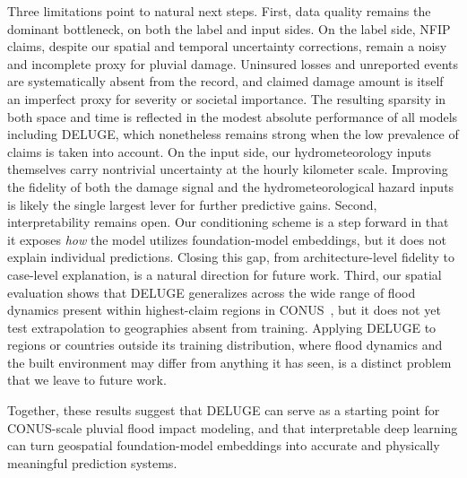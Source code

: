 Three limitations point to natural next steps.
%
First, data quality remains the dominant bottleneck, on both the label and input sides.
%
On the label side, NFIP claims, despite our spatial and temporal uncertainty corrections, remain a noisy and incomplete proxy for pluvial damage.
%
Uninsured losses and unreported events are systematically absent from the record, and claimed damage amount is itself an imperfect proxy for severity or societal importance.
%
The resulting sparsity in both space and time is reflected in the modest absolute performance of all models including DELUGE, which nonetheless remains strong when the low prevalence of claims is taken into account.
%
On the input side, our hydrometeorology inputs themselves carry nontrivial uncertainty at the hourly kilometer scale.
%
Improving the fidelity of both the damage signal and the hydrometeorological hazard inputs is likely the single largest lever for further predictive gains.
%
Second, interpretability remains open.
%
Our conditioning scheme is a step forward in that it exposes \emph{how} the model utilizes foundation-model embeddings, but it does not explain individual predictions.
%
Closing this gap, from architecture-level fidelity to case-level explanation, is a natural direction for future work.
%
Third, our spatial evaluation shows that DELUGE generalizes across the wide range of flood dynamics present within highest-claim regions in CONUS~\cite{brunner_spatial_2020}, but it does not yet test extrapolation to geographies absent from training.
%
Applying DELUGE to regions or countries outside its training distribution, where flood dynamics and the built environment may differ from anything it has seen, is a distinct problem that we leave to future work.

Together, these results suggest that DELUGE can serve as a starting 
point for CONUS-scale pluvial flood impact modeling, and that 
interpretable deep learning can turn geospatial foundation-model 
embeddings into accurate and physically meaningful prediction 
systems.


